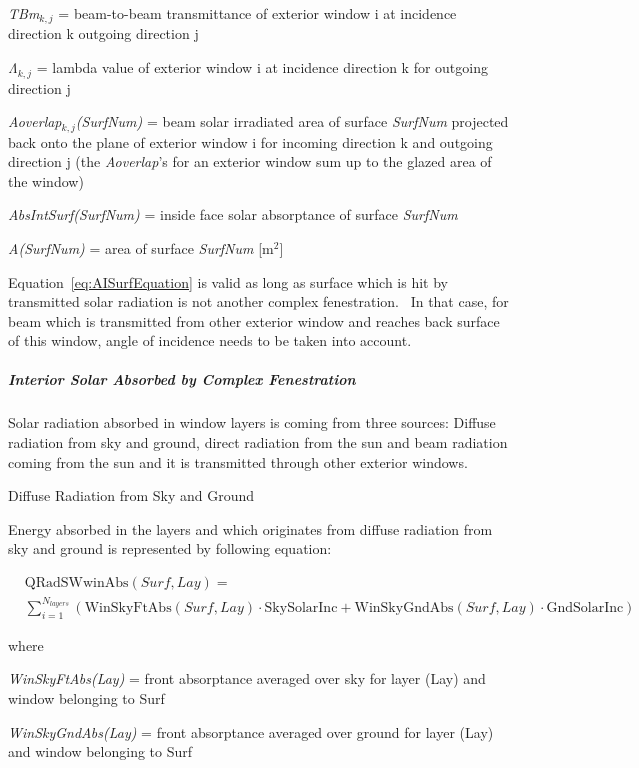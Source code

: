 \emph{TBm\(_{k,j}\)} = beam-to-beam transmittance of exterior window i at incidence direction k outgoing direction j

\emph{Λ\(_{k,j}\)} = lambda value of exterior window i at incidence direction k for outgoing direction j

\emph{Aoverlap\(_{k,j}\)(SurfNum)} = beam solar irradiated area of surface \emph{SurfNum} projected back onto the plane of exterior window i for incoming direction k and outgoing direction j (the \emph{Aoverlap}'s for an exterior window sum up to the glazed area of the window)

\emph{AbsIntSurf(SurfNum)} = inside face solar absorptance of surface \emph{SurfNum}

\emph{A(SurfNum)} = area of surface \emph{SurfNum} {[}m\(^{2}\){]}

Equation~\ref{eq:AISurfEquation} is valid as long as surface which is hit by transmitted solar radiation is not another complex fenestration.~ In that case, for beam which is transmitted from other exterior window and reaches back surface of this window, angle of incidence needs to be taken into account.

\subparagraph{Interior Solar Absorbed by Complex Fenestration}\label{interior-solar-absorbed-by-complex-fenestration}

Solar radiation absorbed in window layers is coming from three sources: Diffuse radiation from sky and ground, direct radiation from the sun and beam radiation coming from the sun and it is transmitted through other exterior windows.

Diffuse Radiation from Sky and Ground

Energy absorbed in the layers and which originates from diffuse radiation from sky and ground is represented by following equation:

\begin{equation}
\begin{split}
&\text{QRadSWwinAbs}(Surf, Lay) = \\
&\sum_{i = 1}^{N_{layers}} \left(\text{WinSkyFtAbs}(Surf, Lay) \cdot \text{SkySolarInc} + \text{WinSkyGndAbs}(Surf, Lay) \cdot \text{GndSolarInc}\right)
\end{split}
\end{equation}

where

\emph{WinSkyFtAbs(Lay)} = front absorptance averaged over sky for layer (Lay) and window belonging to Surf

\emph{WinSkyGndAbs(Lay)} = front absorptance averaged over ground for layer (Lay) and window belonging to Surf

